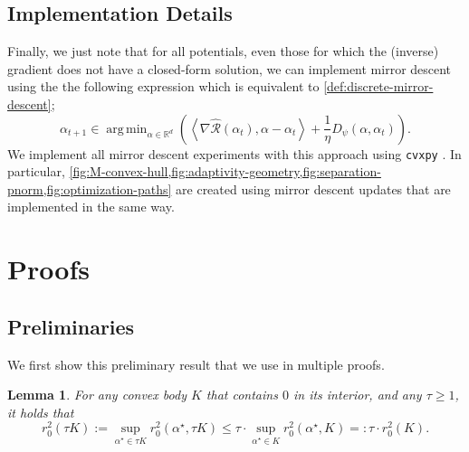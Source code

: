 \documentclass[a4paper]{article}
\newcommand{\pr}[1]{\left(#1\right)}
\newcommand{\inner}[2]{\left\langle #1,#2\right\rangle}
\newcommand{\RR}[0]{\mathbb{R}}
\newcommand{\cR}[0]{\mathcal{R}}
\newcommand{\alphastar}{\alpha^\star}
\newcommand{\alphat}[0]{\alpha_t}
\newcommand{\rzero}[0]{r_{0}}
\DeclareMathOperator*{\argmin}{arg\,min}
\newcommand{\Rhat}[0]{\widehat{\cR}}
\theoremstyle{thmstyle}
\newtheorem{lemma}{Lemma}
\theoremstyle{defstyle}
\theoremstyle{remark}
\begin{document}
\subsection{Implementation Details}
Finally, we just note that for all potentials, even those for which the (inverse) gradient does not have a closed-form solution, we can implement mirror descent using the the following expression which is equivalent to \cref{def:discrete-mirror-descent};
\begin{equation*}
    \alpha_{t+1} \in \argmin_{\alpha\in \RR^d} \pr{ \inner{\nabla\Rhat(\alphat)}{\alpha-\alphat}+\frac{1}{\eta}D_\psi(\alpha,\alphat)}.
\end{equation*}
We implement all mirror descent experiments with this approach using \texttt{cvxpy} \cite{cvxpy}. In particular, \cref{fig:M-convex-hull,fig:adaptivity-geometry,fig:separation-pnorm,fig:optimization-paths} are created using mirror descent updates that are implemented in the same way.

\section{Proofs}




\subsection{Preliminaries}


We first show this preliminary result that we use in multiple proofs.
\begin{lemma}
    For any convex body $K$ that contains $0$ in its interior, and any $\tau\geq 1$, it holds that
\begin{equation}
\label{eq:critical-radius-scaling}
    \rzero^2(\tau K):=\sup_{\alphastar\in \tau K}\rzero^2(\alphastar,\tau K)\leq \tau \cdot \sup_{\alphastar\in K} \rzero^2(\alphastar,K) =: \tau \cdot \rzero^2(K).
\end{equation}
\end{lemma}
\end{document}
